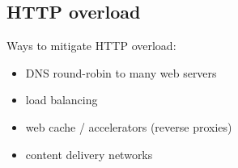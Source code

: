 \documentclass[xga]{xdvislides}
\begin{document}
%
%
\subsection{HTTP overload}
Ways to mitigate HTTP overload:

\begin{itemize}
	\item DNS round-robin to many web servers
	\item load balancing
	\item web cache / accelerators (reverse proxies)
	\item content delivery networks
\end{itemize}
\end{document}
